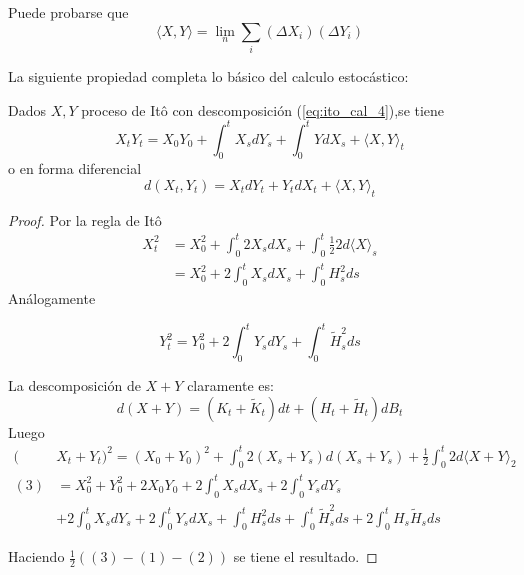 \begin{remark}
        Puede probarse que 
        \begin{equation*}
                \langle X,Y \rangle = \lim_{n} \sum_{i} (\Delta X_i)(\Delta Y_i) 
        \end{equation*}

\end{remark}
        La siguiente propiedad completa lo básico del calculo estocástico:
\begin{proposition}
        Dados $X,Y$ proceso de It\^{o} con descomposición (\ref{eq:ito_cal_4}),se tiene 
        \begin{equation*}
                X_t Y_t = X_0 Y_0 + \int_{0}^{t} X_s dY_s + \int_{0}^{t} Y dX_s + \langle X,Y \rangle_t
        \end{equation*}
        o en forma diferencial 
        \begin{equation*}
                d(X_t, Y_t) = X_t dY_t + Y_t dX_t + \langle X,Y \rangle_t
        \end{equation*}
\end{proposition}

\begin{proof}
\gris
Por la regla de It\^{o} 
\begin{align*}
        \label{eq:ito_cal_5_1}
        \tag{1}
        X^2_{t} &= X^2_{0} + \int_{0}^{t} 2 X_s dX_s 
                           + \int_{0}^{t} \frac{1}{2} 2 d \langle X \rangle_s\\
                &= X^2_{0} + 2 \int_{0}^{t} X_s d X_s + \int_{0}^{t} H_s^2 ds
\end{align*}
Análogamente

\begin{equation*}
        \label{eq:ito_cal_5_2}
        \tag{2}
        Y^2_{t} = Y^2_{0} + 2 \int_{0}^{t} Y_s d Y_s + \int_{0}^{t} \tilde{H}_s^2 ds
\end{equation*}

La descomposición de $X + Y$ claramente es: 
\begin{equation*}
        d(X +Y) = (K_t + \tilde{K}_t) dt + (H_t + \tilde{H}_t) dB_t
\end{equation*}
Luego 
\begin{align*}
        (&X_t + Y_t)^2 = (X_0 + Y_0)^2 + \int_{0}^{t} 2 (X_s + Y_s) d(X_s + Y_s)
                      + \frac{1}{2} \int_{0}^{t} 2d \langle X + Y \rangle_2\\
        (3) &=X_0^2 + Y_0^2 + 2X_0Y_0 + 2 \int_{0}^{t} X_s dX_s + 2 \int_{0}^{t} Y_s dY_s  \\
            &+ 2 \int_{0}^{t} X_s dY_s + 2 \int_{0}^{t} Y_s dX_s + \int_{0}^{t} H_s^2 ds 
            + \int_{0}^{t} \tilde{H}_s^2 ds + 2 \int_{0}^{t} H_s \tilde{H}_s ds 
\end{align*}

Haciendo $\frac{1}{2} ( (3) - (1) - (2) )$ se tiene el resultado.\findem
\negro
\end{proof}

